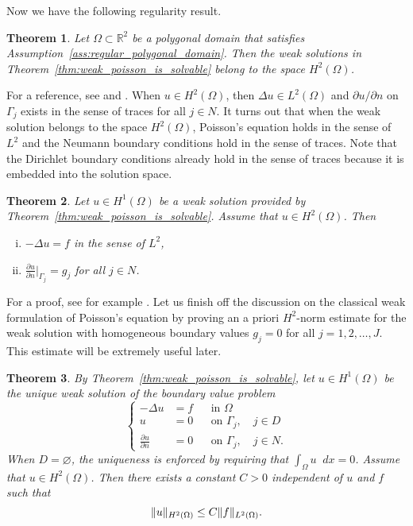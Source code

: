\documentclass[english, 12pt, a4paper, sci, utf8, a-2b, online]{aaltothesis}
\theoremstyle{definition}
\theoremstyle{plain}
\newtheorem{theorem}{Theorem}[section]
\DeclarePairedDelimiter\norm{\lVert}{\rVert}
\newcommand*\diff{\mathop{}\!d}
\numberwithin{equation}{section}
\begin{document}
Now we have the following regularity result.
\begin{theorem}
    \label{thm:H2_regularity}
    Let $\Omega \subset \mathbb{R}^2$ be a polygonal domain that
    satisfies Assumption~\ref{ass:regular_polygonal_domain}.
    Then the weak solutions in Theorem~\ref{thm:weak_poisson_is_solvable}
    belong to the space $H^2(\Omega)$.
\end{theorem}
For a reference, see \cite[Theorem 4.4.4.13 on p. 245]{grisvard2011}
and \cite[Theorem 1]{grisvard1976}.
When $u \in H^2(\Omega)$, then $\Delta u \in L^2(\Omega)$
and $\partial u / \partial n$ on $\Gamma_j$ exists in the sense of traces
for all $j \in N$.
It turns out that when the weak solution belongs
to the space $H^2(\Omega)$, Poisson's equation holds in the sense of $L^2$
and the Neumann boundary conditions hold in the sense of traces.
Note that the Dirichlet boundary conditions already hold in the sense
of traces because it is embedded into the solution space.
\begin{theorem}
    \label{thm:weak_solution_is_strong_solution}
    Let $u \in H^1(\Omega)$ be a weak solution provided by
    Theorem~\ref{thm:weak_poisson_is_solvable}. Assume that $u \in H^2(\Omega)$.
    Then
    \begin{enumerate}[(i)]
        \item $-\Delta u = f$ in the sense of $L^2$,
        \item $\frac{\partial u}{\partial n}|_{\Gamma_j} = g_j$ for all $j \in N$.
    \end{enumerate}
\end{theorem}
For a proof, see for example
\cite[Proposition 5.1.9 on p.\ 131]{scottbrenner2007}.
Let us finish off the discussion on the classical weak
formulation of Poisson's equation
by proving an a priori $H^2$-norm estimate for the weak solution
with homogeneous boundary values $g_j = 0$ for all $j=1,2,\dotsc,J$.
This estimate will be extremely useful later.
\begin{theorem}
    \label{thm:a_priori_H2_estimate}
    By Theorem~\ref{thm:weak_poisson_is_solvable},
    let $u \in H^1(\Omega)$ be the unique weak solution
    of the boundary value problem
    \begin{equation*}
        \left\{
            \begin{aligned}
                -\Delta u &= f && \text{in } \Omega \\
                u &= 0 && \text{on } \Gamma_j, \quad j \in D \\
                \frac{\partial u}{\partial n} &= 0 && \text{on } \Gamma_j,
                \quad j \in N.
            \end{aligned}
        \right.
    \end{equation*}
    When $D = \varnothing$, the uniqueness is enforced by requiring
    that $\int_{\Omega} u \diff x = 0$. Assume that $u \in H^2(\Omega)$.
    Then there exists a constant $C > 0$ independent of $u$ and $f$ such that
    \begin{equation*}
        \norm{u}_{H^2(\Omega)} \leq C \norm{f}_{L^2(\Omega)}.
    \end{equation*}
\end{theorem}
\end{document}
